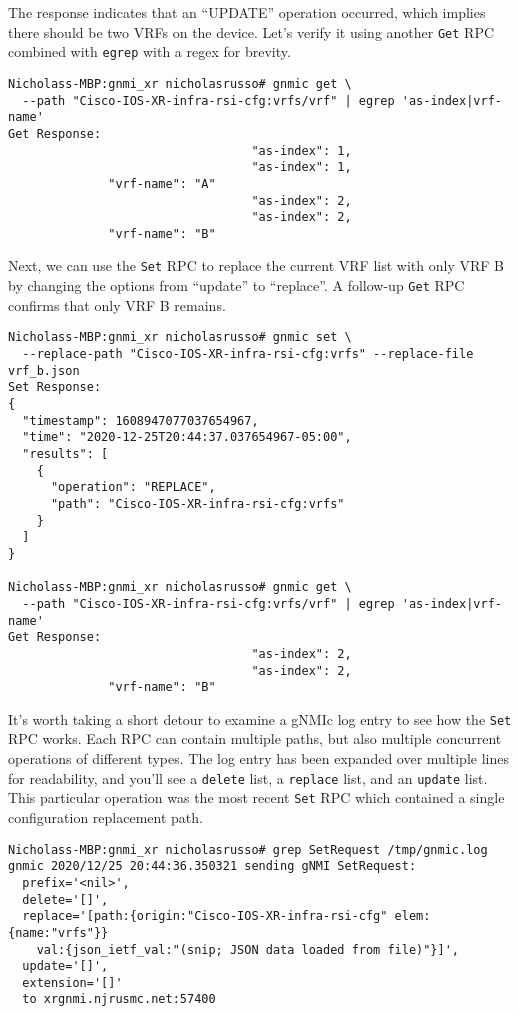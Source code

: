 The response indicates that an ``UPDATE'' operation occurred, which implies
there should be two VRFs on the device. Let's verify it using another
\verb|Get| RPC combined with \verb|egrep| with a regex for brevity.

\begin{verbatim}
Nicholass-MBP:gnmi_xr nicholasrusso# gnmic get \
  --path "Cisco-IOS-XR-infra-rsi-cfg:vrfs/vrf" | egrep 'as-index|vrf-name'
Get Response:
                                  "as-index": 1,
                                  "as-index": 1,
              "vrf-name": "A"
                                  "as-index": 2,
                                  "as-index": 2,
              "vrf-name": "B"
\end{verbatim}

Next, we can use the \verb|Set| RPC to replace the current VRF list
with only VRF B by changing the options from ``update'' to ``replace''.
A follow-up \verb|Get| RPC confirms that only VRF B remains.

\begin{verbatim}
Nicholass-MBP:gnmi_xr nicholasrusso# gnmic set \
  --replace-path "Cisco-IOS-XR-infra-rsi-cfg:vrfs" --replace-file vrf_b.json
Set Response:
{
  "timestamp": 1608947077037654967,
  "time": "2020-12-25T20:44:37.037654967-05:00",
  "results": [
    {
      "operation": "REPLACE",
      "path": "Cisco-IOS-XR-infra-rsi-cfg:vrfs"
    }
  ]
}

Nicholass-MBP:gnmi_xr nicholasrusso# gnmic get \
  --path "Cisco-IOS-XR-infra-rsi-cfg:vrfs/vrf" | egrep 'as-index|vrf-name'
Get Response:
                                  "as-index": 2,
                                  "as-index": 2,
              "vrf-name": "B"
\end{verbatim}

It's worth taking a short detour to examine a gNMIc log entry to see how
the \verb|Set| RPC works. Each RPC can contain multiple paths, but also
multiple concurrent operations of different types. The log entry has
been expanded over multiple lines for readability, and you'll see
a \verb|delete| list, a \verb|replace| list, and an \verb|update| list.
This particular operation was the most recent \verb|Set| RPC which
contained a single configuration replacement path.

\begin{verbatim}
Nicholass-MBP:gnmi_xr nicholasrusso# grep SetRequest /tmp/gnmic.log
gnmic 2020/12/25 20:44:36.350321 sending gNMI SetRequest:
  prefix='<nil>',
  delete='[]',
  replace='[path:{origin:"Cisco-IOS-XR-infra-rsi-cfg" elem:{name:"vrfs"}}
    val:{json_ietf_val:"(snip; JSON data loaded from file)"}]',
  update='[]',
  extension='[]'
  to xrgnmi.njrusmc.net:57400
\end{verbatim}

